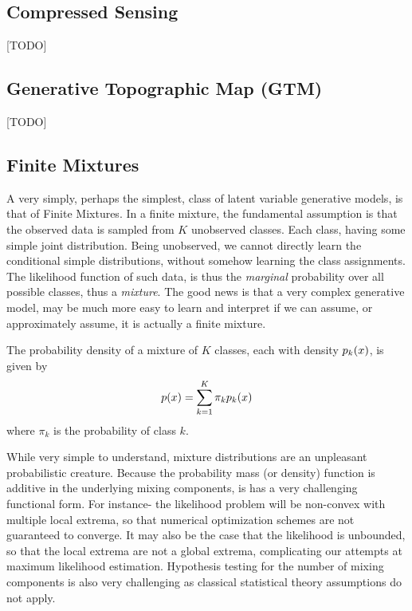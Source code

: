 \subsection{Compressed Sensing}
\label{sec:compressed_sensing}
[TODO]





\subsection{Generative Topographic Map (GTM)}
\label{sec:gtm}
[TODO]



\subsection{Finite Mixtures}


A very simply, perhaps the simplest, class of latent variable generative models, is that of Finite Mixtures. 
In a finite mixture, the fundamental assumption is that the observed data is sampled from $K$ unobserved classes. Each class, having some simple joint distribution. 
Being unobserved, we cannot directly learn the conditional simple distributions, without somehow learning the class assignments. 
The likelihood function of such data, is thus the \emph{marginal} probability over all possible classes, thus a \emph{mixture}.
The good news is that a very complex generative model, may be much more easy to learn and interpret if we can assume, or approximately assume, it is actually a finite mixture.

The probability density of a mixture of $K$ classes, each with density $p_k(x)$, is given by  
\begin{align}
\label{eq:mixture}
	p(x)=\sum_{k=1}^{K} \pi_k p_k(x)
\end{align}
where $\pi_k$ is the probability of class $k$.



\begin{remark}
While very simple to understand, mixture distributions are an unpleasant probabilistic creature. 
Because the probability mass (or density) function is additive in the underlying mixing components, is has a very challenging functional form.
For instance- the likelihood problem will be non-convex with multiple local extrema, so that numerical optimization schemes are not guaranteed to converge.
It may also be the case that the likelihood is unbounded, so that the local extrema are not a global extrema, complicating our attempts at maximum likelihood estimation. 
Hypothesis testing for the number of mixing components is also very challenging as classical statistical theory assumptions do not apply.
\end{remark}


